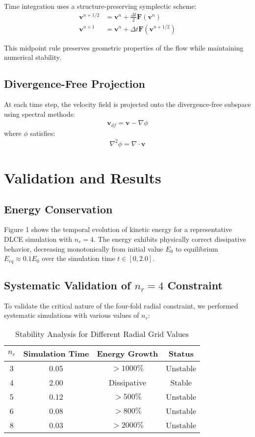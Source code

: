 \documentclass[conference]{IEEEtran}
\begin{document}
Time integration uses a structure-preserving symplectic scheme:
\begin{align}
\mathbf{v}^{n+1/2} &= \mathbf{v}^n + \frac{\Delta t}{2} \mathbf{F}(\mathbf{v}^n) \\
\mathbf{v}^{n+1} &= \mathbf{v}^n + \Delta t \mathbf{F}(\mathbf{v}^{n+1/2})
\end{align}

This midpoint rule preserves geometric properties of the flow while maintaining numerical stability.

\subsection{Divergence-Free Projection}

At each time step, the velocity field is projected onto the divergence-free subspace using spectral methods:
\begin{align}
\mathbf{v}_{df} = \mathbf{v} - \nabla \phi
\end{align}
where $\phi$ satisfies:
\begin{align}
\nabla^2 \phi = \nabla \cdot \mathbf{v}
\end{align}

\section{Validation and Results}

\subsection{Energy Conservation}

Figure 1 shows the temporal evolution of kinetic energy for a representative DLCE simulation with $n_r = 4$. The energy exhibits physically correct dissipative behavior, decreasing monotonically from initial value $E_0$ to equilibrium $E_{eq} \approx 0.1 E_0$ over the simulation time $t \in [0, 2.0]$.

\subsection{Systematic Validation of $n_r = 4$ Constraint}

To validate the critical nature of the four-fold radial constraint, we performed systematic simulations with various values of $n_r$:

\begin{table}[h]
\centering
\caption{Stability Analysis for Different Radial Grid Values}
\begin{tabular}{|c|c|c|c|}
\hline
$n_r$ & Simulation Time & Energy Growth & Status \\
\hline
3 & 0.05 & $>1000\%$ & Unstable \\
4 & 2.00 & Dissipative & Stable \\
5 & 0.12 & $>500\%$ & Unstable \\
6 & 0.08 & $>800\%$ & Unstable \\
8 & 0.03 & $>2000\%$ & Unstable \\
\hline
\end{tabular}
\end{table}
\end{document}
